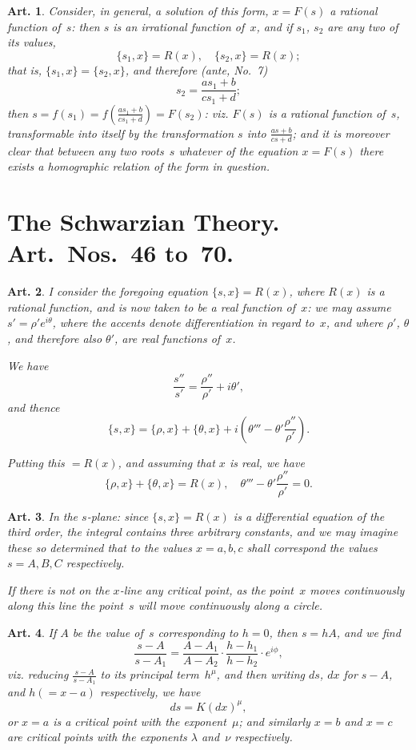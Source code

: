 \documentclass[11pt,a4paper]{article}
\theoremstyle{plain}
\newtheorem{art}{Art.}[section]
\begin{document}
\begin{art}
Consider, in general, a solution of this form, $x = F(s)$ a rational
function of~$s$: then $s$ is an irrational function of~$x$, and if
$s_1$, $s_2$ are any two of its values,
\[
\{s_1, x\} = R(x), \quad \{s_2, x\} = R(x);
\]
that is, $\{s_1, x\} = \{s_2, x\}$, and therefore (ante, No.~7)
\[
s_2 = \frac{as_1 + b}{cs_1 + d};
\]
then $s = f(s_1) = f\left(\frac{as_1+b}{cs_1+d}\right) = F(s_2)$: viz. $F(s)$ is a
rational function of~$s$, transformable into itself by the transformation
$s$ into $\frac{as+b}{cs+d}$; and it is moreover clear that between any two
roots~$s$ whatever of the equation $x = F(s)$ there exists a homographic
relation of the form in question.
\end{art}


\section*{The Schwarzian Theory. Art.~Nos.~46 to~70.}

\begin{art}
I consider the foregoing equation $\{s, x\} = R(x)$, where $R(x)$ is a
rational function, and is now taken to be a real function of~$x$: we may
assume $s' = \rho' e^{i\theta}$, where the accents denote differentiation in regard
to~$x$, and where $\rho'$, $\theta$, and therefore also $\theta'$, are real functions
of~$x$.

We have
\[
\frac{s''}{s'} = \frac{\rho''}{\rho'} + i\theta',
\]
and thence
\[
\{s, x\} = \{\rho, x\} + \{\theta, x\} + i\left(\theta''' - \theta' \frac{\rho''}{\rho'}\right).
\]

Putting this $= R(x)$, and assuming that $x$ is real, we have
\[
\{\rho, x\} + \{\theta, x\} = R(x), \quad \theta''' - \theta' \frac{\rho''}{\rho'} = 0.
\]
\end{art}

\begin{art}
In the $s$-plane: since $\{s, x\} = R(x)$ is a differential equation of the
third order, the integral contains three arbitrary constants, and we may
imagine these so determined that to the values $x = a, b, c$ shall correspond
the values $s = A, B, C$ respectively.

If there is not on the $x$-line any critical point, as the point~$x$ moves
continuously along this line the point~$s$ will move continuously along a
circle.
\end{art}

\begin{art}
If $A$ be the value of~$s$ corresponding to $h = 0$, then $s = hA$, and we find
\[
\frac{s - A}{s - A_1} = \frac{A - A_1}{A - A_2} \cdot \frac{h - h_1}{h - h_2} \cdot e^{i\phi},
\]
viz. reducing $\frac{s-A}{s-A_1}$ to its principal term~$h^\mu$, and then writing
$ds$, $dx$ for $s-A$, and $h (= x-a)$ respectively, we have
\[
ds = K (dx)^\mu,
\]
or $x = a$ is a critical point with the exponent~$\mu$; and similarly $x = b$
and $x = c$ are critical points with the exponents $\lambda$ and~$\nu$ respectively.
\end{art}
\end{document}
